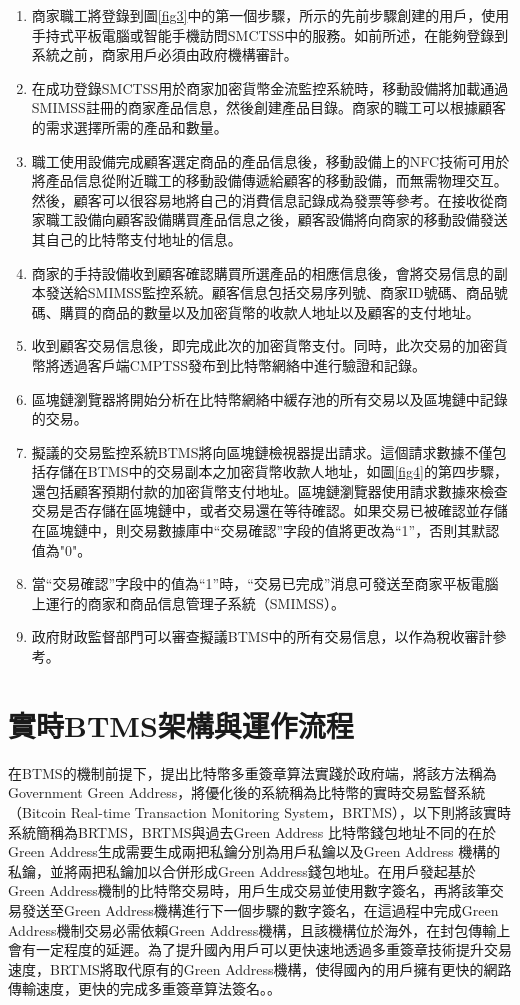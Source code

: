 		\begin{enumerate}
			\item 商家職工將登錄到圖\ref{fig3}中的第一個步驟，所示的先前步驟創建的用戶，使用手持式平板電腦或智能手機訪問SMCTSS中的服務。如前所述，在能夠登錄到系統之前，商家用戶必須由政府機構審計。
			\item 在成功登錄SMCTSS用於商家加密貨幣金流監控系統時，移動設備將加載通過SMIMSS註冊的商家產品信息，然後創建產品目錄。商家的職工可以根據顧客的需求選擇所需的產品和數量。

			\item 職工使用設備完成顧客選定商品的產品信息後，移動設備上的NFC技術可用於將產品信息從附近職工的移動設備傳遞給顧客的移動設備，而無需物理交互。然後，顧客可以很容易地將自己的消費信息記錄成為發票等參考。在接收從商家職工設備向顧客設備購買產品信息之後，顧客設備將向商家的移動設備發送其自己的比特幣支付地址的信息。
			\item 商家的手持設備收到顧客確認購買所選產品的相應信息後，會將交易信息的副本發送給SMIMSS監控系統。顧客信息包括交易序列號、商家ID號碼、商品號碼、購買的商品的數量以及加密貨幣的收款人地址以及顧客的支付地址。
			\item 收到顧客交易信息後，即完成此次的加密貨幣支付。同時，此次交易的加密貨幣將透過客戶端CMPTSS發布到比特幣網絡中進行驗證和記錄。
			\item 區塊鏈瀏覽器將開始分析在比特幣網絡中緩存池的所有交易以及區塊鏈中記錄的交易。
			\item 擬議的交易監控系統BTMS將向區塊鏈檢視器提出請求。這個請求數據不僅包括存儲在BTMS中的交易副本之加密貨幣收款人地址，如圖\ref{fig4}的第四步驟，還包括顧客預期付款的加密貨幣支付地址。區塊鏈瀏覽器使用請求數據來檢查交易是否存儲在區塊鏈中，或者交易還在等待確認。如果交易已被確認並存儲在區塊鏈中，則交易數據庫中“交易確認”字段的值將更改為“1”，否則其默認值為"0"。
			\item 當“交易確認”字段中的值為“1”時，“交易已完成”消息可發送至商家平板電腦上運行的商家和商品信息管理子系統（SMIMSS）。
			\item 政府財政監督部門可以審查擬議BTMS中的所有交易信息，以作為稅收審計參考。
		\end{enumerate}

\section{實時BTMS架構與運作流程}

		在BTMS的機制前提下，提出比特幣多重簽章算法實踐於政府端，將該方法稱為Government Green Address，將優化後的系統稱為比特幣的實時交易監督系統（Bitcoin Real-time Transaction Monitoring System，BRTMS），以下則將該實時系統簡稱為BRTMS，BRTMS與過去Green Address 比特幣錢包地址不同的在於Green Address生成需要生成兩把私鑰分別為用戶私鑰以及Green Address 機構的私鑰，並將兩把私鑰加以合併形成Green Address錢包地址。在用戶發起基於Green Address機制的比特幣交易時，用戶生成交易並使用數字簽名，再將該筆交易發送至Green Address機構進行下一個步驟的數字簽名，在這過程中完成Green Address機制交易必需依賴Green Address機構，且該機構位於海外，在封包傳輸上會有一定程度的延遲。為了提升國內用戶可以更快速地透過多重簽章技術提升交易速度，BRTMS將取代原有的Green Address機構，使得國內的用戶擁有更快的網路傳輸速度，更快的完成多重簽章算法簽名。\supercite{tanet}。 

